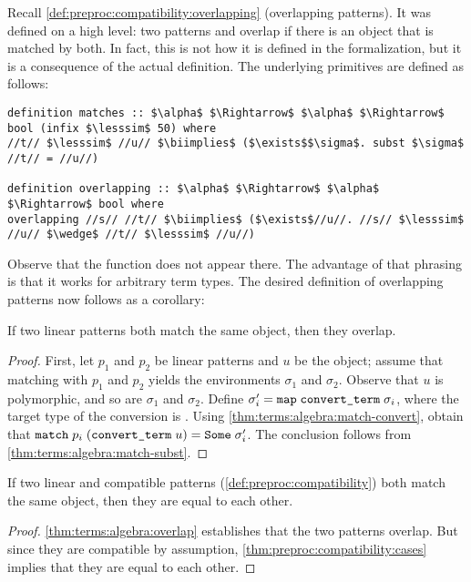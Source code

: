 \noindent
Recall \cref{def:preproc:compatibility:overlapping} (overlapping patterns).
It was defined on a high level:
two patterns and overlap if there is an object that is matched by both.
In fact, this is not how it is defined in the formalization, but it is a consequence of the actual definition.
The underlying primitives are defined as follows:
%
\begin{lstlisting}[language=Isabelle]
definition matches :: $\alpha$ $\Rightarrow$ $\alpha$ $\Rightarrow$ bool (infix $\lesssim$ 50) where
//t// $\lesssim$ //u// $\biimplies$ ($\exists$$\sigma$. subst $\sigma$ //t// = //u//)

definition overlapping :: $\alpha$ $\Rightarrow$ $\alpha$ $\Rightarrow$ bool where
overlapping //s// //t// $\biimplies$ ($\exists$//u//. //s// $\lesssim$ //u// $\wedge$ //t// $\lesssim$ //u//)
\end{lstlisting}
%
Observe that the  function does not appear there.
The advantage of that phrasing is that it works for arbitrary term types.
The desired definition of overlapping patterns now follows as a corollary:

\begin{corollary}\label{thm:terms:algebra:overlap}
  If two linear patterns both match the same object, then they overlap.
\end{corollary}

\begin{proof}
  First, let $p_1$ and $p_2$ be linear patterns and $u$ be the object; assume that matching with $p_1$ and $p_2$ yields the environments $\sigma_1$ and $\sigma_2$.
  Observe that $u$ is polymorphic, and so are $\sigma_1$ and $\sigma_2$.
  Define $\sigma_i' = \texttt{\textup{map}}\;\texttt{\textup{convert\_term}}\;\sigma_i$, where the target type of the conversion is .
  Using \cref{thm:terms:algebra:match-convert}, obtain that $\texttt{\textup{match}}\;p_i\;(\texttt{\textup{convert\_term}}\;u) = \texttt{\textup{Some}}\;\sigma_i'$.
  The conclusion follows from \cref{thm:terms:algebra:match-subst}.
\end{proof}

\begin{corollary}\label{thm:terms:algebra:compatible-eq}
  If two linear and compatible patterns (\cref{def:preproc:compatibility}) both match the same object, then they are equal to each other.
\end{corollary}

\begin{proof}
  \cref{thm:terms:algebra:overlap} establishes that the two patterns overlap.
  But since they are compatible by assumption, \cref{thm:preproc:compatibility:cases} implies that they are equal to each other.
\end{proof}


